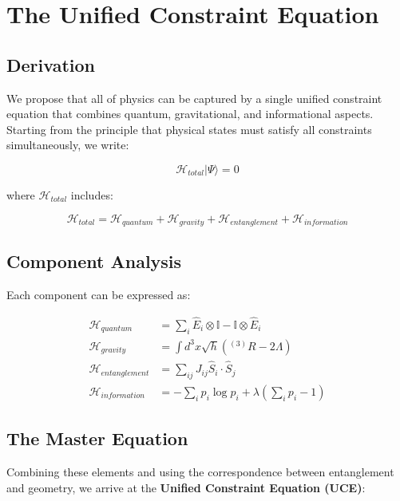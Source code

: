 \documentclass[12pt,a4paper]{article}
\begin{document}
\section{The Unified Constraint Equation}

\subsection{Derivation}

We propose that all of physics can be captured by a single unified constraint equation that combines quantum, gravitational, and informational aspects. Starting from the principle that physical states must satisfy all constraints simultaneously, we write:

\begin{equation}
\mathcal{H}_{total}|\Psi\rangle = 0
\end{equation}

where $\mathcal{H}_{total}$ includes:

\begin{equation}
\mathcal{H}_{total} = \mathcal{H}_{quantum} + \mathcal{H}_{gravity} + \mathcal{H}_{entanglement} + \mathcal{H}_{information}
\end{equation}

\subsection{Component Analysis}

Each component can be expressed as:

\begin{align}
\mathcal{H}_{quantum} &= \sum_i \hat{E}_i \otimes \mathbb{I} - \mathbb{I} \otimes \hat{E}_i \\
\mathcal{H}_{gravity} &= \int d^3x \sqrt{h} \left( {}^{(3)}R - 2\Lambda \right) \\
\mathcal{H}_{entanglement} &= \sum_{ij} J_{ij} \hat{S}_i \cdot \hat{S}_j \\
\mathcal{H}_{information} &= -\sum_i p_i \log p_i + \lambda \left(\sum_i p_i - 1\right)
\end{align}

\subsection{The Master Equation}

Combining these elements and using the correspondence between entanglement and geometry, we arrive at the \textbf{Unified Constraint Equation (UCE)}:
\end{document}
